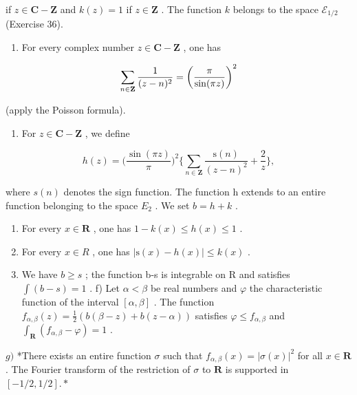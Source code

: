 if \(z \in \mathbf{C} - \mathbf{Z}\) and \(k(z) = 1\) if \(z \in \mathbf{Z}\) . The function \(k\) belongs to the space \(\mathcal{E}_{1/2}\) (Exercise 36).

\begin{enumerate}
\def\labelenumi{\alph{enumi})}
\tightlist
\item
  For every complex number \(z \in \mathbf{C} - \mathbf{Z}\) , one has
\end{enumerate}

\[
\sum_ {n \in {\bf Z}} \frac {1}{(z - n) ^ {2}} = \left(\frac {\pi}{\sin (\pi z)}\right) ^ {2}
\]

(apply the Poisson formula).

\begin{enumerate}
\def\labelenumi{\alph{enumi})}
\setcounter{enumi}{1}
\tightlist
\item
  For \(z \in \mathbf{C} - \mathbf{Z}\) , we define
\end{enumerate}

\[
h (z) = \Big (\frac {\sin (\pi z)}{\pi} \Big) ^ {2} \Big \{\sum_ {n \in \mathbf {Z}} \frac {\mathrm{s} (n)}{(z - n) ^ {2}} + \frac {2}{z} \Big \},
\]

where \(s(n)\) denotes the sign function. The function h extends to an entire function belonging to the space \(E_{2}\) . We set \(b = h + k\) .

\begin{enumerate}
\def\labelenumi{\alph{enumi})}
\setcounter{enumi}{2}
\item
  For every \(x \in \mathbf{R}\) , one has \(1 - k(x) \leqslant h(x) \leqslant 1\) .
\item
  For every \(x \in R\) , one has \(|\mathrm{s}(x) - h(x)| \leqslant k(x)\) .
\item
    We have \(b \geqslant s\) ; the function b-s is integrable on R and satisfies \(\int(b - s) = 1\) . f) Let \(\alpha < \beta\) be real numbers and \(\varphi\) the characteristic function of the interval \([\alpha, \beta]\) . The function \(f_{\alpha,\beta}(z) = \frac{1}{2}(b(\beta - z) + b(z - \alpha))\) satisfies \(\varphi \leqslant f_{\alpha,\beta}\) and \(\int_{\mathbf{R}}(f_{\alpha,\beta} - \varphi) = 1\) .
\end{enumerate}

\(g)\) *There exists an entire function \(\sigma\) such that \(f_{\alpha,\beta}(x)=|\sigma(x)|^{2}\) for all \(x\in\mathbf{R}\) . The Fourier transform of the restriction of \(\sigma\) to \(\mathbf{R}\) is supported in \([-1/2,1/2].*\)

